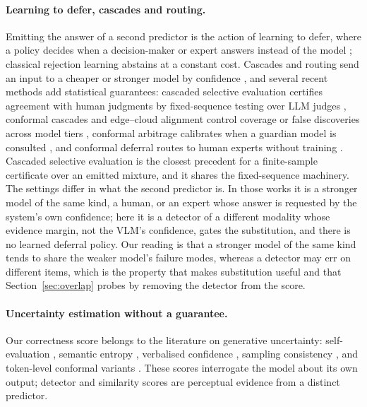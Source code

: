 \paragraph{Learning to defer, cascades and routing.}
Emitting the answer of a second predictor is the action of learning to defer, where a policy decides when a decision-maker or expert answers instead of
the model \citep{madras2018defer,mozannar2020defer}; classical rejection learning \citep{cortes2016} abstains at a constant cost. Cascades and
routing send an input to a cheaper or stronger model by confidence \citep{chen2024frugalgpt}, and several recent methods add statistical guarantees:
cascaded selective evaluation certifies agreement with human judgments by fixed-sequence testing over LLM judges \citep{jung2025trust}, conformal cascades
and edge--cloud alignment control coverage or false discoveries across model tiers \citep{dou2026conformalcascade,huang2025edgecloud}, conformal arbitrage
calibrates when a guardian model is consulted \citep{overman2025arbitrage}, and conformal deferral routes to human experts without training
\citep{bary2025noneed}. Cascaded selective evaluation is the closest precedent for a finite-sample certificate over an emitted mixture, and it shares the fixed-sequence
machinery. The settings differ in what the second predictor is. In those works it is a stronger model of the same kind, a human, or an expert whose answer is
requested by the system's own confidence; here it is a detector of a different modality whose evidence margin, not the VLM's confidence, gates the substitution, and
there is no learned deferral policy. Our reading is that a stronger model of the same kind tends to share the weaker model's failure modes, whereas a detector
may err on different items, which is the property that makes substitution useful and that Section~\ref{sec:overlap} probes by removing the detector from the score.

\paragraph{Uncertainty estimation without a guarantee.}
Our correctness score belongs to the literature on generative uncertainty: self-evaluation
\citep{kadavath2022}, semantic entropy \citep{kuhn2023,farquhar2024}, verbalised confidence
\citep{lin2022}, sampling consistency \citep{manakul2023,wang2023selfconsistency}, and token-level
conformal variants \citep{tecp,cover}. These scores interrogate the model about its own output;
detector and similarity scores are perceptual evidence from a distinct predictor.

